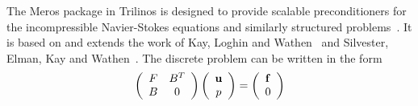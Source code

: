 \documentclass[12pt,relax]{TPA}
\begin{document}
The Meros package in Trilinos is designed to provide scalable
preconditioners for the incompressible Navier-Stokes equations and similarly
structured problems~\cite{ElmaHowlShadTumi2003}.  
It is based on and extends the work of Kay,
Loghin and Wathen~\cite{KayLoghWath2002} and Silvester, Elman, Kay and
Wathen~\cite{SilvElmaKayWath2001}.  
The discrete problem can be written in the form
\begin{equation}
\label{eq:NSmatrix}
\left(\begin{array}{cc}
	F & B^T \\
	B & 0 \\
\end{array}\right)
\left(\begin{array}{c}
	{\bf u} \\
	p \\
\end{array}\right)
=
\left(\begin{array}{c}
	{\bf f} \\
	0 \\
	\end{array}\right)
\end{equation}
\end{document}
